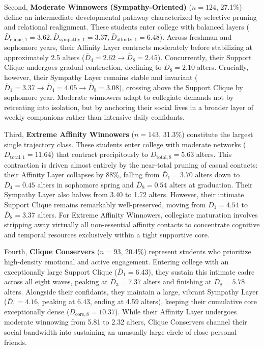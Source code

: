 \documentclass[12pt]{article}
\begin{document}
Second, \textbf{Moderate Winnowers (Sympathy-Oriented)} ($n = 124$, 27.1\%) define an intermediate developmental pathway characterized by selective pruning and relational realignment. These students enter college with balanced layers ($\bar{D}_{\text{clique}, 1} = 3.62, \bar{D}_{\text{sympathy}, 1} = 3.37, \bar{D}_{\text{affinity}, 1} = 6.48$). Across freshman and sophomore years, their Affinity Layer contracts moderately before stabilizing at approximately 2.5 alters ($\bar{D}_{4} = 2.62 \rightarrow \bar{D}_{8} = 2.45$). Concurrently, their Support Clique undergoes gradual contraction, declining to $\bar{D}_{8} = 2.10$ alters. Crucially, however, their Sympathy Layer remains stable and invariant ($\bar{D}_{1} = 3.37 \rightarrow \bar{D}_{4} = 4.05 \rightarrow \bar{D}_{8} = 3.08$), crossing above the Support Clique by sophomore year. Moderate winnowers adapt to collegiate demands not by retreating into isolation, but by anchoring their social lives in a broader layer of weekly companions rather than intensive daily confidants.

Third, \textbf{Extreme Affinity Winnowers} ($n = 143$, 31.3\%) constitute the largest single trajectory class. These students enter college with moderate networks ($\bar{D}_{\text{total}, 1} = 11.64$) that contract precipitously to $\bar{D}_{\text{total}, 8} = 5.63$ alters. This contraction is driven almost entirely by the near-total pruning of casual contacts: their Affinity Layer collapses by 88\%, falling from $\bar{D}_{1} = 3.70$ alters down to $\bar{D}_{4} = 0.45$ alters in sophomore spring and $\bar{D}_{8} = 0.54$ alters at graduation. Their Sympathy Layer also halves from 3.40 to 1.72 alters. However, their intimate Support Clique remains remarkably well-preserved, moving from $\bar{D}_{1} = 4.54$ to $\bar{D}_{8} = 3.37$ alters. For Extreme Affinity Winnowers, collegiate maturation involves stripping away virtually all non-essential affinity contacts to concentrate cognitive and temporal resources exclusively within a tight supportive core.

Fourth, \textbf{Clique Conservers} ($n = 93$, 20.4\%) represent students who prioritize high-density emotional and active engagement. Entering college with an exceptionally large Support Clique ($\bar{D}_{1} = 6.43$), they sustain this intimate cadre across all eight waves, peaking at $\bar{D}_{3} = 7.37$ alters and finishing at $\bar{D}_{8} = 5.78$ alters. Alongside their confidants, they maintain a large, vibrant Sympathy Layer ($\bar{D}_{1} = 4.16$, peaking at 6.43, ending at 4.59 alters), keeping their cumulative core exceptionally dense ($\bar{D}_{\text{core}, 8} = 10.37$). While their Affinity Layer undergoes moderate winnowing from 5.81 to 2.32 alters, Clique Conservers channel their social bandwidth into sustaining an unusually large circle of close personal friends.
\end{document}
